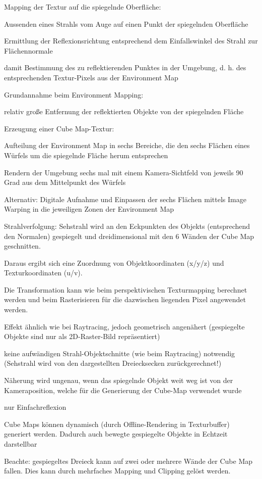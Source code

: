 \documentclass[landscape]{article}
\begin{document}
\begin{multicols}{3}
  Mapping der Textur auf die spiegelnde Oberfläche:
  \begin{itemize*}
    \item Aussenden eines Strahls vom Auge auf einen Punkt der spiegelnden Oberfläche
    \item Ermittlung der Reflexionsrichtung entsprechend dem Einfallswinkel des Strahl zur Flächennormale
    \item damit Bestimmung des zu reflektierenden Punktes in der Umgebung, d. h. des entsprechenden Textur-Pixels aus der Environment Map
  \end{itemize*}
  
  Grundannahme beim Environment Mapping:
  \begin{itemize*}
    \item relativ große Entfernung der reflektierten Objekte von der spiegelnden Fläche
  \end{itemize*}
  
  Erzeugung einer Cube Map-Textur:
  \begin{itemize*}
    \item Aufteilung der Environment Map in sechs Bereiche, die den sechs Flächen eines Würfels um die spiegelnde Fläche herum entsprechen
    \item Rendern der Umgebung sechs mal mit einem Kamera-Sichtfeld von jeweils 90 Grad aus dem Mittelpunkt des Würfels
    \item Alternativ: Digitale Aufnahme und Einpassen der sechs Flächen mittels Image Warping in die jeweiligen Zonen der Environment Map
    \item Strahlverfolgung: Sehstrahl wird an den Eckpunkten des Objekts (entsprechend den Normalen) gespiegelt und dreidimensional mit den 6 Wänden der Cube Map geschnitten.
    \item Daraus ergibt sich eine Zuordnung von Objektkoordinaten (x/y/z) und Texturkoordinaten (u/v).
    \item Die Transformation kann wie beim perspektivischen Texturmapping berechnet werden und beim Rasterisieren für die dazwischen liegenden Pixel angewendet werden.
    \item Effekt ähnlich wie bei Raytracing, jedoch geometrisch angenähert (gespiegelte Objekte sind nur als 2D-Raster-Bild repräsentiert)
    \item keine aufwändigen Strahl-Objektschnitte (wie beim Raytracing) notwendig (Sehstrahl wird von den dargestellten Dreiecksecken zurückgerechnet!)
    \item Näherung wird ungenau, wenn das spiegelnde Objekt weit weg ist von der Kameraposition, welche für die Generierung der Cube-Map verwendet wurde
    \item nur Einfachreflexion
    \item Cube Maps können dynamisch (durch Offline-Rendering in Texturbuffer) generiert werden. Dadurch auch bewegte gespiegelte Objekte in Echtzeit darstellbar
    \item Beachte: gespiegeltes Dreieck kann auf zwei oder mehrere Wände der Cube Map fallen. Dies kann durch mehrfaches Mapping und Clipping gelöst werden.
  \end{itemize*}
  

\end{multicols}
\end{document}
